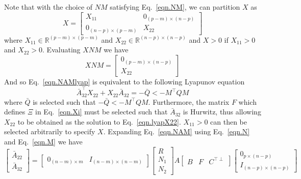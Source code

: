 \documentclass[]{../sty/JGCD}
\theoremstyle{examplestyle}
\begin{document}
  Note that with the choice of $NM$ satisfying Eq.\ \eqref{eqn.NM}, we can partition $X$ as
  \begin{equation}
    \label{eqn.Xpartition}
    X=
    \begin{bmatrix}
      X_{11} & 0_{(p-m)\times(n-p)} \\
      0_{(n-p)\times(p-m)} & X_{22}
    \end{bmatrix}
  \end{equation}
  where $X_{11}\in\mathbb{R}^{(p-m)\times(p-m)}$ and $X_{22}\in\mathbb{R}^{(n-p)\times(n-p)}$ and $X>0$ if $X_{11}>0$ and $X_{22}>0$.
  Evaluating $XNM$ we have
  \begin{equation*}
    XNM=
    \begin{bmatrix}
      0_{(p-m)\times(n-p)} \\
      X_{22}
    \end{bmatrix}
  \end{equation*}
  And so Eq.\ \eqref{eqn.NAMlyap} is equivalent to the following Lyapunov equation
  \begin{equation}
    \label{eqn.lyapX22}
    \bar{A}_{32}^{\top}X_{22}+X_{22}\bar{A}_{32}  = -\bar{Q} < -M^{\top}QM
  \end{equation}
  where $\bar{Q}$ is selected such that $-\bar{Q} < -M^{\top}QM$.
  Furthermore, the matrix $F$ which defines $\Xi$ in Eq.\ \eqref{eqn.Xi} must be selected such that $\bar{A}_{32}$ is Hurwitz, thus allowing $X_{22}$ to be obtained as the solution to Eq.\ \eqref{eqn.lyapX22}.
  $X_{11}>0$ can then be selected arbitrarily to specify $X$.
  Expanding Eq.\ \eqref{eqn.NAM} using Eq.\ \eqref{eqn.N} and Eq.\ \eqref{eqn.M} we have
  \begin{equation*}
    \begin{bmatrix}
      \bar{A}_{22} \\
      \bar{A}_{32}
    \end{bmatrix}=
    \begin{bmatrix}
      0_{(n-m)\times m} & I_{(n-m)\times(n-m)}
    \end{bmatrix}
    \begin{bmatrix}
      R \\
      N_{1} \\
      N_{2}
    \end{bmatrix}
    A
    \begin{bmatrix}
      B & F & C^{\top\perp}
    \end{bmatrix}
    \begin{bmatrix}
      0_{p\times(n-p)} \\
      I_{(n-p)\times(n-p)}
    \end{bmatrix}
  \end{equation*}
\end{document}
